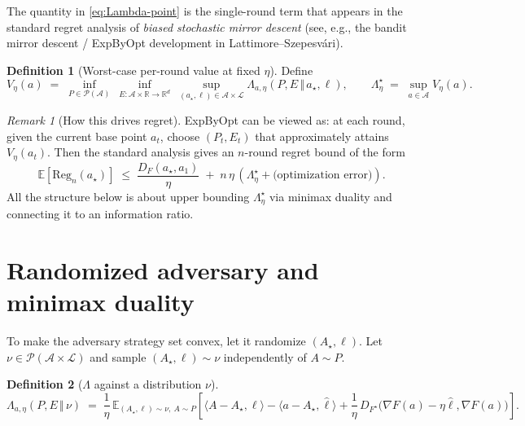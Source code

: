\documentclass[11pt]{article}
\newcommand{\R}{\mathbb{R}}
\newcommand{\Rd}{\mathbb{R}^d}
\newcommand{\E}{\mathbb{E}}
\newcommand{\ip}[2]{\langle #1,#2\rangle}
\newcommand{\cA}{\mathcal{A}}
\newcommand{\cL}{\mathcal{L}}
\newcommand{\cP}{\mathcal{P}}
\theoremstyle{definition}
\newtheorem{definition}{Definition}
\theoremstyle{plain}
\theoremstyle{remark}
\newtheorem{remark}{Remark}
\begin{document}
The quantity in \eqref{eq:Lambda-point} is the single-round term that appears in the standard regret analysis of \emph{biased stochastic mirror descent} (see, e.g., the bandit mirror descent / ExpByOpt development in Lattimore--Szepesv\'ari).

\begin{definition}[Worst-case per-round value at fixed $\eta$]
    Define
    \[
        V_\eta(a)
        \;=\;
        \inf_{P\in\cP(\cA)}\ \inf_{E:\cA\times\R\to\Rd}\ \sup_{(a_\star,\ell)\in\cA\times\cL}
        \Lambda_{a,\eta}(P,E \,\Vert\, a_\star,\ell),
        \qquad
        \Lambda^\star_\eta
        \;=\;
        \sup_{a\in\cA} V_\eta(a).
    \]
\end{definition}

\begin{remark}[How this drives regret]
    ExpByOpt can be viewed as: at each round, given the current base point $a_t$, choose $(P_t,E_t)$ that approximately attains $V_\eta(a_t)$.
    Then the standard analysis gives an $n$-round regret bound of the form
    \[
        \E[\mathrm{Reg}_n(a_\star)]
        \;\le\;
        \frac{D_F(a_\star,a_1)}{\eta}
        \;+\;
        n\,\eta\,(\Lambda^\star_\eta+\text{(optimization error)}).
    \]
    All the structure below is about upper bounding $\Lambda^\star_\eta$ via minimax duality and connecting it to an information ratio.
\end{remark}

\section{Randomized adversary and minimax duality}

To make the adversary strategy set convex, let it randomize $(A_\star,\ell)$.
Let $\nu\in\cP(\cA\times\cL)$ and sample $(A_\star,\ell)\sim \nu$ independently of $A\sim P$.

\begin{definition}[$\Lambda$ against a distribution $\nu$]
    \begin{equation}
        \label{eq:Lambda-nu}
        \Lambda_{a,\eta}(P,E \,\Vert\, \nu)
        \;=\;
        \frac{1}{\eta}\,
        \E_{(A_\star,\ell)\sim\nu,\ A\sim P}\!\left[
        \ip{A-A_\star}{\ell}
        -\ip{a-A_\star}{\hat\ell}
        +\frac{1}{\eta}\,D_{F^\star}\!\big(\nabla F(a)-\eta \hat\ell,\nabla F(a)\big)
        \right].
    \end{equation}
\end{definition}
\end{document}

